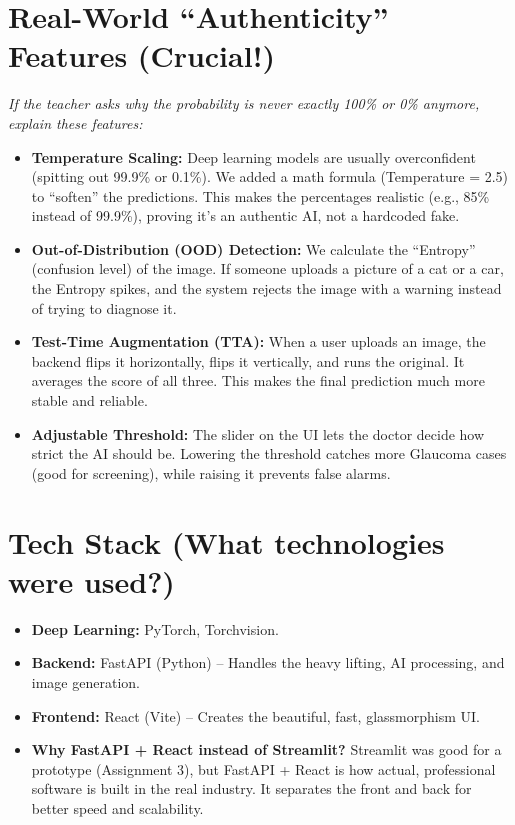 \documentclass[11pt,a4paper]{article}
\begin{document}
\section{Real-World ``Authenticity'' Features (Crucial!)}
\textit{If the teacher asks why the probability is never exactly 100\% or 0\% anymore, explain these features:}
\begin{itemize}
    \item \textbf{Temperature Scaling:} Deep learning models are usually overconfident (spitting out 99.9\% or 0.1\%). We added a math formula (Temperature = 2.5) to ``soften'' the predictions. This makes the percentages realistic (e.g., 85\% instead of 99.9\%), proving it's an authentic AI, not a hardcoded fake.
    \item \textbf{Out-of-Distribution (OOD) Detection:} We calculate the ``Entropy'' (confusion level) of the image. If someone uploads a picture of a cat or a car, the Entropy spikes, and the system rejects the image with a warning instead of trying to diagnose it.
    \item \textbf{Test-Time Augmentation (TTA):} When a user uploads an image, the backend flips it horizontally, flips it vertically, and runs the original. It averages the score of all three. This makes the final prediction much more stable and reliable.
    \item \textbf{Adjustable Threshold:} The slider on the UI lets the doctor decide how strict the AI should be. Lowering the threshold catches more Glaucoma cases (good for screening), while raising it prevents false alarms.
\end{itemize}

\section{Tech Stack (What technologies were used?)}
\begin{itemize}
    \item \textbf{Deep Learning:} PyTorch, Torchvision.
    \item \textbf{Backend:} FastAPI (Python) -- Handles the heavy lifting, AI processing, and image generation.
    \item \textbf{Frontend:} React (Vite) -- Creates the beautiful, fast, glassmorphism UI.
    \item \textbf{Why FastAPI + React instead of Streamlit?} Streamlit was good for a prototype (Assignment 3), but FastAPI + React is how actual, professional software is built in the real industry. It separates the front and back for better speed and scalability.
\end{itemize}
\end{document}
